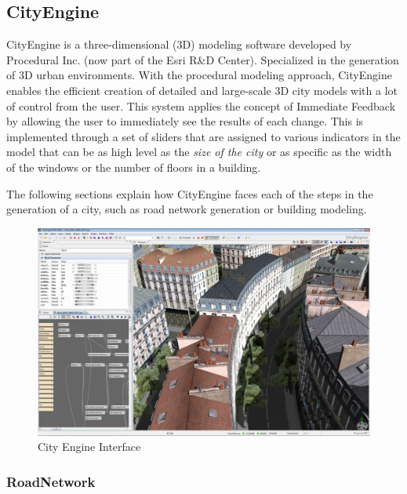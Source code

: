 
\subsection{CityEngine \cite{Parish2001} \cite{Muller2006}}
\label{sub:cityengine}

CityEngine is a three-dimensional (3D) modeling software developed by Procedural Inc. (now part of the Esri R\&D Center). Specialized in the generation of 3D urban environments. With the procedural modeling approach, CityEngine enables the efficient creation of detailed and large-scale 3D city models with a lot of control from the user. This system applies the concept of Immediate Feedback by allowing the user to immediately see the results of each change. This is implemented through a set of sliders that are assigned to various indicators in the model that can be as high level as the \emph{size of the city} or as specific as the width of the windows or the number of floors in a building.

The following sections explain how CityEngine faces each of the steps in the generation of a city, such as road network generation or building modeling.

\begin{figure}[htbp]
  \centering
  \includegraphics[width=\textwidth]{img/Procedural-Modeling-of-Cities/interface.jpg}
  \caption{City Engine Interface}
  \label{fig:CEinterface}
\end{figure}

\subsubsection{RoadNetwork} %
\label{ssub:roadnetwork1}


